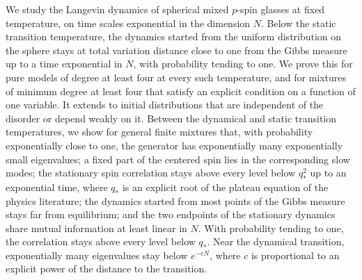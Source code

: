 We study the Langevin dynamics of spherical mixed $p$-spin glasses at fixed temperature, on time scales exponential in the dimension $N$. Below the static transition temperature, the dynamics started from the uniform distribution on the sphere stays at total variation distance close to one from the Gibbs measure up to a time exponential in $N$, with probability tending to one. We prove this for pure models of degree at least four at every such temperature, and for mixtures of minimum degree at least four that satisfy an explicit condition on a function of one variable. It extends to initial distributions that are independent of the disorder or depend weakly on it. Between the dynamical and static transition temperatures, we show for general finite mixtures that, with probability exponentially close to one, the generator has exponentially many exponentially small eigenvalues; a fixed part of the centered spin lies in the corresponding slow modes; the stationary spin correlation stays above every level below $q_*^2$ up to an exponential time, where $q_*$ is an explicit root of the plateau equation of the physics literature; the dynamics started from most points of the Gibbs measure stays far from equilibrium; and the two endpoints of the stationary dynamics share mutual information at least linear in $N$. With probability tending to one, the correlation stays above every level below $q_*$. Near the dynamical transition, exponentially many eigenvalues stay below $e^{-cN}$, where $c$ is proportional to an explicit power of the distance to the transition.
